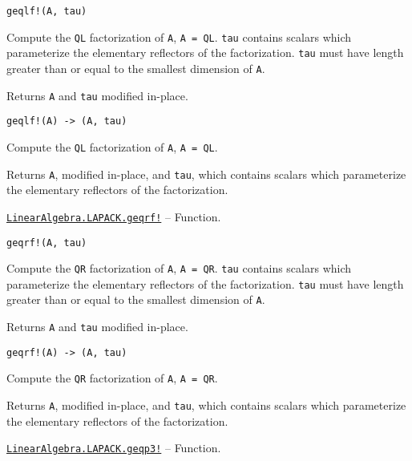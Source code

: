 \begin{adjustwidth}{2em}{0pt}


\begin{verbatim}
geqlf!(A, tau)
\end{verbatim}

Compute the \texttt{QL} factorization of \texttt{A}, \texttt{A = QL}. \texttt{tau} contains scalars which parameterize the elementary reflectors of the factorization. \texttt{tau} must have length greater than or equal to the smallest dimension of \texttt{A}.

Returns \texttt{A} and \texttt{tau} modified in-place.




\begin{lstlisting}
geqlf!(A) -> (A, tau)
\end{lstlisting}

Compute the \texttt{QL} factorization of \texttt{A}, \texttt{A = QL}.

Returns \texttt{A}, modified in-place, and \texttt{tau}, which contains scalars which parameterize the elementary reflectors of the factorization.



\end{adjustwidth}
\hypertarget{1667844416130160920}{}
\hyperlink{1667844416130160920}{\texttt{LinearAlgebra.LAPACK.geqrf!}}  -- {Function.}

\begin{adjustwidth}{2em}{0pt}


\begin{verbatim}
geqrf!(A, tau)
\end{verbatim}

Compute the \texttt{QR} factorization of \texttt{A}, \texttt{A = QR}. \texttt{tau} contains scalars which parameterize the elementary reflectors of the factorization. \texttt{tau} must have length greater than or equal to the smallest dimension of \texttt{A}.

Returns \texttt{A} and \texttt{tau} modified in-place.




\begin{lstlisting}
geqrf!(A) -> (A, tau)
\end{lstlisting}

Compute the \texttt{QR} factorization of \texttt{A}, \texttt{A = QR}.

Returns \texttt{A}, modified in-place, and \texttt{tau}, which contains scalars which parameterize the elementary reflectors of the factorization.



\end{adjustwidth}
\hypertarget{18183103848385216109}{}
\hyperlink{18183103848385216109}{\texttt{LinearAlgebra.LAPACK.geqp3!}}  -- {Function.}

